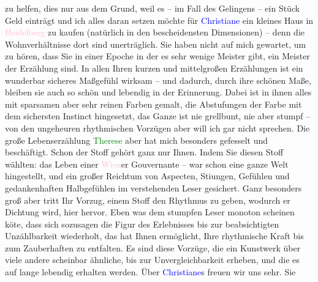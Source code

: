                zu helfen, dies nur aus dem Grund, weil es – im Fall des Gelingens – ein Stück Geld
               einträgt und ich alles daran setzen möchte für \textcolor{blue}{Christiane}{}\ledrightnote{\textcolor{blue}{Christiane von Hofmannsthal}} ein kleines Haus in \textcolor{pink}{Heidelberg}{}\ledrightnote{\textcolor{pink}{Heidelberg}}
               zu kaufen (natürlich in den bescheidensten Dimensionen) – denn die Wohnverhältnisse
               dort sind unerträglich.\pend
           \pstart
           Sie haben nicht auf mich gewartet, um zu hören, dass Sie in einer Epoche in der es
               sehr wenige Meister gibt, ein Meister der Erzählung sind. In allen Ihren kurzen und
               mittelgroßen Erzählungen ist ein wunderbar sicheres Maßgefühl wirksam – und dadurch,
               durch ihre schönen Maße, bleiben sie auch so schön und lebendig in der Erinnerung.
                  {\pb}Dabei ist in ihnen alles mit
               sparsamen aber sehr reinen Farben gemalt, die Abstufungen der Farbe mit dem
               sichersten Instinct hingesetzt, das Ganze ist nie grellbunt, nie aber stumpf – von
               den ungeheuren rhythmischen Vorzügen aber will ich gar nicht sprechen. Die große
               Lebenserzählung \textcolor{green}{Therese}{}\ledrightnote{\textcolor{green}{Therese. Chronik eines Frauenlebens}} aber hat mich besonders
               gefesselt und beschäftigt. Schon der Stoff gehört ganz nur Ihnen. Indem Sie diesen
               Stoff wählten: das Leben einer \textcolor{pink}{Wien}{}\ledrightnote{\textcolor{pink}{Wien}}er Gouvernante –
               war schon eine ganze Welt hingestellt, und ein großer Reichtum von Aspecten, Sti{\geminationm}ungen, Gefühlen und gedankenhaften Halbgefühlen im
               verstehenden Leser gesichert. Ganz besonders groß aber tritt Ihr Vorzug, einem Stoff
               den Rhythmus zu geben, wodurch er Dichtung wird, hier hervor. Eben was dem stumpfen
               Leser monoton scheinen kö{\geminationn}te, dass sich sozusagen die
               Figur des Erlebnisses bis zur beabsichtigten Unzählbarkeit wiederholt, das hat Ihnen
               ermöglicht, Ihre rhythmische Kraft bis zum Zauberhaften zu entfalten. Es sind diese
               Vorzüge, die ein Kunstwerk über viele andere scheinbar ähnliche, bis zur
               Unvergleichbarkeit erheben, und die {\pb}es auf lange lebendig erhalten
               werden.\pend
           \pstart
           Über \textcolor{blue}{Christiane}{}\ledrightnote{\textcolor{blue}{Christiane von Hofmannsthal}}s \label{K_L02503_3v}\label{K_L02503_3h} freuen wir uns sehr. Sie
